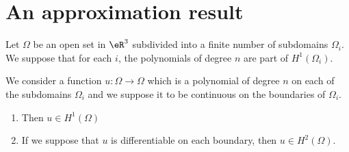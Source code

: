 \section{An approximation result}

\begin{theorem}
	Let \( \Omega\) be an open set in \( \eR^3\) subdivided into a finite number of subdomains \( \Omega_i\). We suppose that for each \( i\), the polynomials of degree \( n\) are part of \( H^1(\Omega_i)\).

	We consider a function \( u\colon \Omega\to \Omega\) which is a polynomial of degree \( n\) on each of the subdomains \( \Omega_i\) and we suppose it to be continuous on the boundaries of \( \Omega_i\).

	\begin{enumerate}
		\item
		      Then \( u\in H^1(\Omega)\)
		\item
		      If we suppose that \( u\) is differentiable on each boundary, then \( u\in H^2(\Omega)\).
	\end{enumerate}
\end{theorem}

